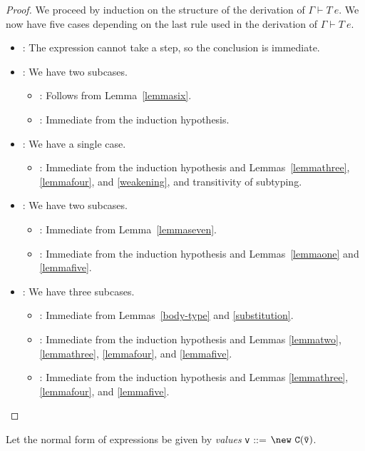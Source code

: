 \begin{proof}
We proceed by induction on the
structure of the derivation of $\Gamma \vdash T\ e$.  We now have five
cases depending on the last rule used in the derivation
of $\Gamma \vdash T\ e$.
\begin{itemize}
\item
\TVar: The expression cannot take a step, so the conclusion is immediate.
\item
\TCast: We have two subcases.
   \begin{itemize}
   \item
   \RCast: Follows from Lemma~\ref{lemmasix}.
   \item
   \RCCast: Immediate from the induction hypothesis.
   \end{itemize}
\item
\TNew: We have a single case.
   \begin{itemize}
   \item
   \RCNewArg: Immediate from the induction hypothesis and 
   Lemmas~\ref{lemmathree}, \ref{lemmafour}, and \ref{weakening}, 
   and transitivity of subtyping.
   \end{itemize}
\item
\TField: We have two subcases.
   \begin{itemize}
   \item
   \RField: Immediate from Lemma~\ref{lemmaseven}.
   \item
   \RCField: Immediate from the induction hypothesis and 
   Lemmas~\ref{lemmaone} and \ref{lemmafive}.
   \end{itemize}
\item
\TInvk: We have three subcases.
   \begin{itemize}
   \item
   \RInvk: Immediate from Lemmas~\ref{body-type} and \ref{substitution}.
   \item
   \RCInvkRecv: Immediate from the induction hypothesis and 
   Lemmas \ref{lemmatwo}, \ref{lemmathree}, \ref{lemmafour}, and \ref{lemmafive}.
   \item
   \RCInvkArg: Immediate from the induction hypothesis and 
   Lemmas \ref{lemmathree}, \ref{lemmafour}, and \ref{lemmafive}.
   \end{itemize}
\end{itemize}
\end{proof}

\noindent
Let the normal form of expressions be given by {\em values}
{\tt v} {::=} $\new\ {\tt C(\bar{\tt v})}$.

